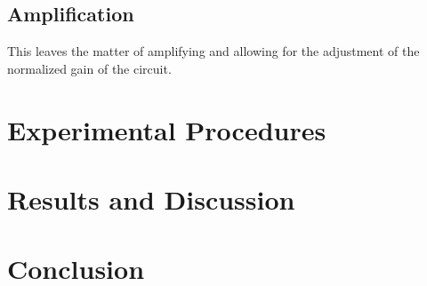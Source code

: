 \documentclass[12pt]{article}
\begin{document}
\subsection{Amplification}
This leaves the matter of amplifying and allowing for the adjustment of the normalized gain of the circuit.
\section{Experimental Procedures}

\section{Results and Discussion}

\section{Conclusion}
\end{document}
